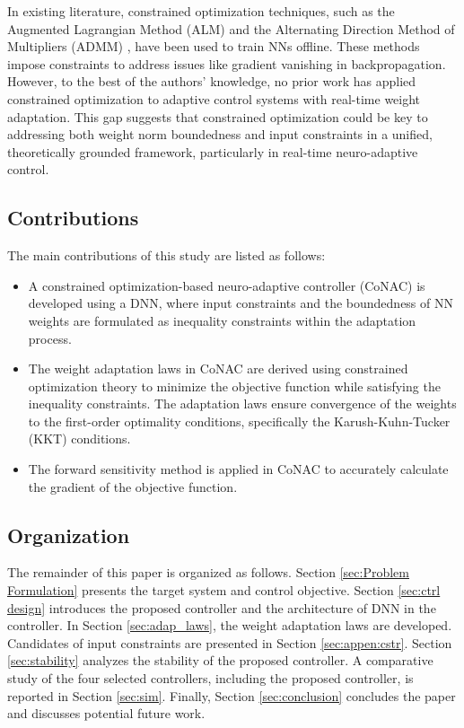 \documentclass[lettersize,journal]{IEEEtran}
\begin{document}
In existing literature, constrained optimization techniques, such as the Augmented Lagrangian Method (ALM) \cite{Evens:2021aa} and the Alternating Direction Method of Multipliers (ADMM) \cite{Wang:2019aa,Taylor:2016aa}, have been used to train NNs offline. 
These methods impose constraints to address issues like gradient vanishing in backpropagation. 
However, to the best of the authors' knowledge, no prior work has applied constrained optimization to adaptive control systems with real-time weight adaptation. 
This gap suggests that constrained optimization could be key to addressing both weight norm boundedness and input constraints in a unified, theoretically grounded framework, particularly in real-time neuro-adaptive control.

\subsection{Contributions}

The main contributions of this study are listed as follows:
\begin{itemize}
    \item A constrained optimization-based neuro-adaptive controller (CoNAC) is developed using a DNN, where input constraints and the boundedness of NN weights are formulated as inequality constraints within the adaptation process.
    \item The weight adaptation laws in CoNAC are derived using constrained optimization theory to minimize the objective function while satisfying the inequality constraints. The adaptation laws ensure convergence of the weights to the first-order optimality conditions, specifically the Karush-Kuhn-Tucker (KKT) conditions.
    \item The forward sensitivity method is applied in CoNAC to accurately calculate the gradient of the objective function. 
\end{itemize}

\subsection{Organization}

The remainder of this paper is organized as follows. 
Section \ref{sec:Problem Formulation} presents the target system and control objective.
Section \ref{sec:ctrl design} introduces the proposed controller and the architecture of DNN in the controller. 
In Section \ref{sec:adap_laws}, the weight adaptation laws are developed.
Candidates of input constraints are presented in Section \ref{sec:appen:cstr}.
Section \ref{sec:stability} analyzes the stability of the proposed controller.
A comparative study of the four selected controllers, including the proposed controller, is reported in Section \ref{sec:sim}.
Finally, Section \ref{sec:conclusion} concludes the paper and discusses potential future work.
\end{document}
